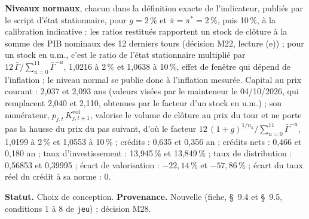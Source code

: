 \documentclass[11pt,a4paper]{article}
\begin{document}
\begin{proposee}
\textbf{Niveaux normaux}, chacun dans la définition exacte de l'indicateur, publiés par le script d'état stationnaire, pour $g = 2\,\%$ et $\bar\pi = \pi^\ast = 2\,\%$, puis 10\,\%, à la calibration indicative : les ratios restitués rapportent un stock de clôture à la somme des PIB nominaux des 12 derniers tours (décision M22, lecture (e)) ; pour un stock en u.m., c'est le ratio de l'état stationnaire multiplié par $12\,\bar\Gamma/\sum_{u=0}^{11}\bar\Gamma^{-u}$, 1,0216 à 2\,\% et 1,0638 à 10\,\%, effet de fenêtre qui dépend de l'inflation ; le niveau normal se publie donc à l'inflation mesurée. Capital au prix courant : 2,037 et 2,093 ans (valeurs visées par le mainteneur le 04/10/2026, qui remplacent 2,040 et 2,110, obtenues par le facteur d'un stock en u.m.) ; son numérateur, $p_{j,t}\,K^{\mathrm{vol}}_{j,t+1}$, valorise le volume de clôture au prix du tour et ne porte pas la hausse du prix du pas suivant, d'où le facteur $12\,(1 + g)^{1/n_a}/\sum_{u=0}^{11}\bar\Gamma^{-u}$, 1,0199 à 2\,\% et 1,0553 à 10\,\% ; crédits : 0,635 et 0,356 an ; crédits nets : 0,466 et 0,180 an ; taux d'investissement : 13,945\,\% et 13,849\,\% ; taux de distribution : 0,56853 et 0,39995 ; écart de valorisation : $-22{,}14\,\%$ et $-57{,}86\,\%$ ; écart du taux réel du crédit à sa norme : 0.

\textbf{Statut.} Choix de conception. \textbf{Provenance.} Nouvelle (fiche, \S~9.4 et \S~9.5, conditions 1 à 8 de \texttt{jeu}) ; décision M28.
\end{proposee}
\end{document}
